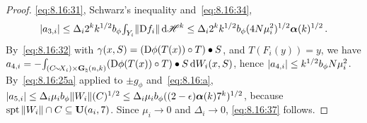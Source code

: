 \begin{proof}
    \eqref{eq:8.16:31}, Schwarz's inequality and~\eqref{eq:8.16:34},
    \begin{displaymath}
        |a_{3,i}| \le \Delta_i 2^{k} k^{1/2} b_\phi {\textstyle\int_{Y_i}^{}} \|\mathrm{D} f_i\| \,\mathrm{d}
        \mathscr{H}^{k} \le \Delta_i 2^{k} k^{1/2} b_\phi (4 N \mu_i^2)^{1/2}
        \boldsymbol{\alpha}(k)^{1/2} \,.
    \end{displaymath}
    By~\eqref{eq:8.16:32} with $\gamma(x,S) = (\mathrm{D} \phi(T(x)) \circ T) \bullet S$, and $T(F_i(y)) =
    y$, we have $a_{4,i} = - {\textstyle\int_{(C \!\sim\! X_i) \times \mathbf{G}_{\natural}(n,k)}^{}} (\mathrm{D}
    \phi(T(x)) \circ T) \bullet S \,\mathrm{d} W_i(x,S)$, hence $|a_{4,i}| \le k^{1/2} b_\phi N \mu_i^2$.
    By~\eqref{eq:8.16:25a} applied to $\pm g_\phi$ and~\eqref{eq:8.16:a}, $|a_{5,i}| \le \Delta_i
    \mu_i b_\phi \|W_i\|(C)^{1/2} \le \Delta_i \mu_i b_\phi ((2 - \epsilon) \boldsymbol{\alpha}(k)
    7^{k})^{1/2}$, because $\operatorname{spt} \|W_i\| \cap C \subseteq \mathbf{U}(a_i,7)$. Since $\mu_i \to 0$
    and $\Delta_i \to 0$, \eqref{eq:8.16:37} follows.


\end{proof}
